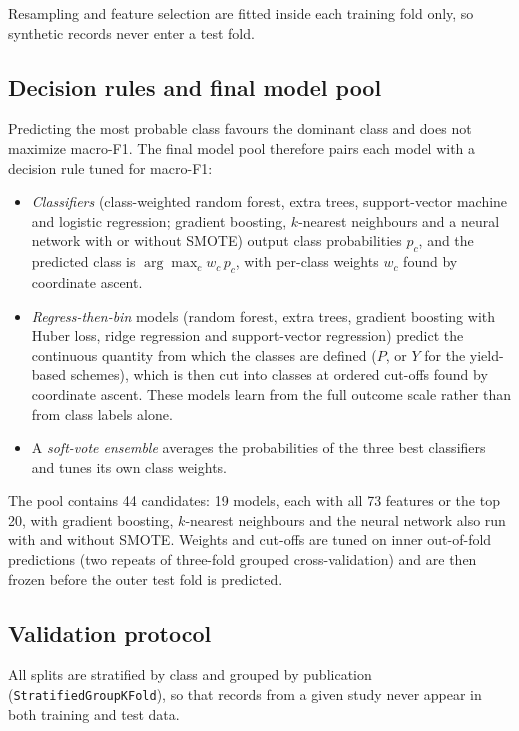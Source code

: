 \documentclass[10pt,a4paper]{article}
\begin{document}
Resampling and feature selection are fitted inside each training fold only, so
synthetic records never enter a test fold.

\subsection{Decision rules and final model pool}
\label{sec:rules}

Predicting the most probable class favours the dominant class and does not
maximize macro-F1. The final model pool therefore pairs each model with a
decision rule tuned for macro-F1:
\begin{itemize}
\item \emph{Classifiers} (class-weighted random forest, extra trees,
  support-vector machine and logistic regression; gradient boosting,
  $k$-nearest neighbours and a neural network with or without SMOTE) output
  class probabilities $p_c$, and the predicted class is
  $\arg\max_c w_c\, p_c$, with per-class weights $w_c$ found by coordinate
  ascent.
\item \emph{Regress-then-bin} models (random forest, extra trees, gradient
  boosting with Huber loss, ridge regression and support-vector regression)
  predict the continuous quantity from which the classes are defined ($P$, or
  $Y$ for the yield-based schemes), which is then cut into classes at ordered
  cut-offs found by coordinate ascent. These models learn from the full
  outcome scale rather than from class labels alone.
\item A \emph{soft-vote ensemble} averages the probabilities of the three best
  classifiers and tunes its own class weights.
\end{itemize}
The pool contains 44 candidates: 19 models, each with all 73 features or the
top 20, with gradient boosting, $k$-nearest neighbours and the neural network
also run with and without SMOTE.
Weights and cut-offs are tuned on inner out-of-fold predictions (two repeats of
three-fold grouped cross-validation) and are then frozen before the outer test
fold is predicted.

\subsection{Validation protocol}
\label{sec:validation}

All splits are stratified by class and grouped by publication
(\texttt{StratifiedGroupKFold}), so that records from a given study never
appear in both training and test data.
\end{document}
